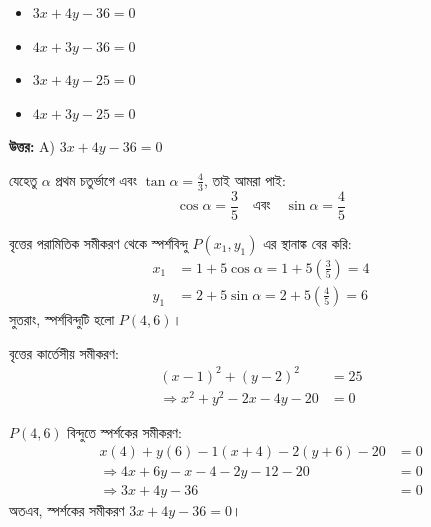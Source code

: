 \documentclass[12pt, a4paper]{article}
\begin{document}
\vspace{1em}
\begin{itemize}[label={}, leftmargin=1cm, itemsep=0.5em]
    \item[\textbf{A)}] $3x + 4y - 36 = 0$
    \item[\textbf{B)}] $4x + 3y - 36 = 0$
    \item[\textbf{C)}] $3x + 4y - 25 = 0$
    \item[\textbf{D)}] $4x + 3y - 25 = 0$
\end{itemize}

\vspace{0.5em}
\begin{tcolorbox}[answerbox]
    \textbf{\color{success} উত্তর:} A) $3x + 4y - 36 = 0$
\end{tcolorbox}
\vspace{1em}

\begin{tcolorbox}[solutionbox={সমাধান (Solution)}]
    \noindent
    যেহেতু $\alpha$ প্রথম চতুর্ভাগে এবং $\tan\alpha = \frac{4}{3}$, তাই আমরা পাই: 
    \[ \cos\alpha = \frac{3}{5} \quad \text{এবং} \quad \sin\alpha = \frac{4}{5} \]
    
    বৃত্তের পরামিতিক সমীকরণ থেকে স্পর্শবিন্দু $P(x_1, y_1)$ এর স্থানাঙ্ক বের করি:
    \begin{align*}
        x_1 &= 1 + 5\cos\alpha = 1 + 5\left(\frac{3}{5}\right) = 4 \\
        y_1 &= 2 + 5\sin\alpha = 2 + 5\left(\frac{4}{5}\right) = 6
    \end{align*}
    সুতরাং, স্পর্শবিন্দুটি হলো $P(4, 6)$। 
    
    বৃত্তের কার্তেসীয় সমীকরণ: 
    \begin{align*}
        (x - 1)^2 + (y - 2)^2 &= 25 \\
        \Rightarrow x^2 + y^2 - 2x - 4y - 20 &= 0
    \end{align*}
    
    $P(4, 6)$ বিন্দুতে স্পর্শকের সমীকরণ: 
    \begin{align*}
        x(4) + y(6) - 1(x + 4) - 2(y + 6) - 20 &= 0 \\
        \Rightarrow 4x + 6y - x - 4 - 2y - 12 - 20 &= 0 \\
        \Rightarrow 3x + 4y - 36 &= 0
    \end{align*}
    অতএব, স্পর্শকের সমীকরণ \textbf{$3x + 4y - 36 = 0$}।
\end{tcolorbox}

\vspace{2em}
\end{document}

